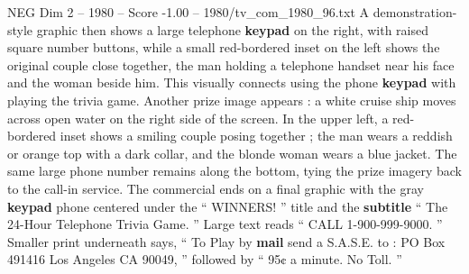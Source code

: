 \begin{textsample}{NEG Dim 2 – 1980 – Score -1.00 – 1980/tv\_com\_1980\_96.txt}
A demonstration-style graphic then shows a large telephone \textbf{keypad} on the right, with raised square number buttons, while a small red-bordered inset on the left shows the original couple close together, the man holding a telephone handset near his face and the woman beside him.
This visually connects using the phone \textbf{keypad} with playing the trivia game.
Another prize image appears : a white cruise ship moves across open water on the right side of the screen.
In the upper left, a red-bordered inset shows a smiling couple posing together ; the man wears a reddish or orange top with a dark collar, and the blonde woman wears a blue jacket.
The same large phone number remains along the bottom, tying the prize imagery back to the call-in service.
The commercial ends on a final graphic with the gray \textbf{keypad} phone centered under the “ WINNERS! ” title and the \textbf{subtitle} “ The 24-Hour Telephone Trivia Game. ” Large text reads “ CALL 1-900-999-9000. ” Smaller print underneath says, “ To Play by \textbf{mail} send a S.A.S.E. to : PO Box 491416 Los Angeles CA 90049, ” followed by “ 95¢ a minute.
No Toll. ”

\end{textsample}
